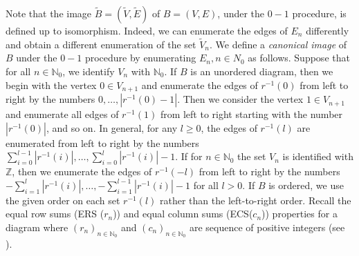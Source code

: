 \documentclass[11pt,reqno]{amsart}
\theoremstyle{definition}
\theoremstyle{remark}
\theoremstyle{plain}
\def\tl{\widetilde}
\newcommand{\N}{\mathbb N}
\newcommand{\Z}{\mathbb Z}
\numberwithin{equation}{section}
\begin{document}
Note that the image $\tl B = (\tl V, \tl E)$ of $B = (V, E)$, under the $0-1$ procedure, is defined up to isomorphism. Indeed, we can enumerate the edges of $E_n$ differently and obtain a different enumeration of the set $\tl V_n$. We define a \textit{canonical image} of $B$ under the $0-1$ procedure by enumerating $E_n, n \in N_0$ as follows. Suppose that for all $n \in \N_0$, we identify $V_n$ with $\N_0$. If $B$ is an unordered diagram, then we begin with the vertex $0 \in V_{n+1}$ and enumerate the edges of $r^{-1}(0)$ from left to right by the numbers $0, \ldots, |r^{-1}(0) - 1|$. Then we consider the vertex $1 \in V_{n+1}$ and enumerate all edges of $r^{-1}(1)$ from left to right starting with the number $|r^{-1}(0)|$, and so on. In general, for any $l \geq 0$, the edges of $r^{-1}(l)$ are enumerated from left to right by the numbers $\sum_{i = 0}^{l-1}|r^{-1}(i)|, \ldots, \sum_{i = 0}^{l}|r^{-1}(i)| - 1$. If for $n \in \N_0$ the set $V_{n}$ is identified with $ \Z$, then we enumerate the edges of $r^{-1}(-l)$ from left to right by the numbers $- \sum_{i=1}^{l}|r^{-1}(i)|, \ldots, -\sum_{i=1}^{l-1}|r^{-1}(i)| - 1$ for all $l > 0$. If $B$ is ordered, we use the given order on each set $r^{-1}(l)$ rather than the left-to-right order. Recall the equal row sums (ERS ($r_n$)) and equal column sums (ECS($c_n$)) properties for a diagram where $(r_n)_{n \in \N_0}$ and $(c_n)_{n \in \N_0}$ are sequence of positive integers (see ). 
\end{document}
